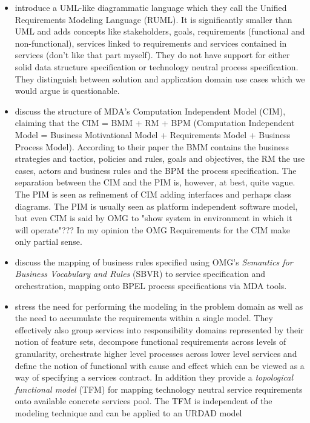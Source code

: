 \begin{itemize}
   \item \cite{helming_towards_2010} introduce a UML-like diagrammatic language which they call the Unified Requirements Modeling Language (RUML). It is significantly smaller than UML and adds concepts like stakeholders, goals, requirements (functional and non-functional), services linked to requirements and services contained in services (don't like that part myself). They do not have support for either solid data structure specification or technology neutral process specification. They distinguish between solution and application domain use cases which we would argue is questionable.
   \item \cite{samir_towards_2010} discuss the structure of MDA's Computation Independent Model (CIM), claiming that the CIM = BMM + RM + BPM  (Computation Independent Model = Business Motivational Model + Requirements Model + Business Process Model). According to their paper the BMM contains the business strategies and tactics, policies and rules, goals and objectives, the RM the use cases, actors and business rules and the BPM the process specification. The separation between the CIM and the PIM is, however, at best, quite vague. The PIM is seen as refinement of CIM adding interfaces and perhaps class diagrams. The PIM is usually seen as platform independent software model, but even CIM is said by OMG to "show system in environment in which it will operate"??? In my opinion the OMG Requirements for the CIM make only partial sense. 
   \item \cite{iacob_model-driven_2008} discuss the mapping of business rules specified using OMG's {\em Semantics for Business Vocabulary and Rules} (SBVR) to service specification and orchestration, mapping onto BPEL process specifications via MDA tools.
   \item \cite{asnina_computation_2010} stress the need for performing the modeling in the problem domain as well as the need to accumulate the requirements within a single model. They effectively also group services into responsibility domains represented by their notion of feature sets, decompose functional requirements across levels of granularity, orchestrate higher level processes across lower level services and define the notion of functional with cause and effect which can be viewed as a way of specifying a services contract. In addition they provide a {\em topological functional model} (TFM) for mapping technology neutral service requirements onto available concrete services pool. The TFM is independent of the modeling technique and can be applied to an URDAD model

\end{itemize}
